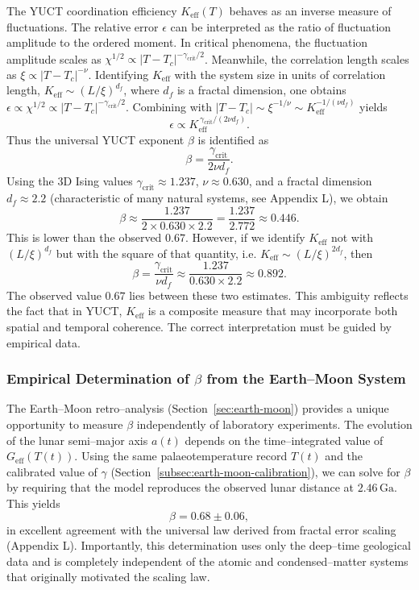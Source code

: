 \documentclass[12pt]{article}
\theoremstyle{remark}
\begin{document}
	The YUCT coordination efficiency \(K_{\mathrm{eff}}(T)\) behaves as an inverse measure of fluctuations. The relative error \(\epsilon\) can be interpreted as the ratio of fluctuation amplitude to the ordered moment. In critical phenomena, the fluctuation amplitude scales as \(\chi^{1/2} \propto |T - T_c|^{-\gamma_{\mathrm{crit}}/2}\). Meanwhile, the correlation length scales as \(\xi \propto |T - T_c|^{-\nu}\). Identifying \(K_{\mathrm{eff}}\) with the system size in units of correlation length, \(K_{\mathrm{eff}} \sim (L/\xi)^{d_f}\), where \(d_f\) is a fractal dimension, one obtains \(\epsilon \propto \chi^{1/2} \propto |T - T_c|^{-\gamma_{\mathrm{crit}}/2}\). Combining with \(|T - T_c| \sim \xi^{-1/\nu} \sim K_{\mathrm{eff}}^{-1/(\nu d_f)}\) yields
	\[
	\epsilon \propto K_{\mathrm{eff}}^{\,\gamma_{\mathrm{crit}}/(2\nu d_f)}.
	\]
	Thus the universal YUCT exponent \(\beta\) is identified as
	\begin{equation}
		\label{eq:beta-from-critical}
		\beta = \frac{\gamma_{\mathrm{crit}}}{2\nu d_f}.
	\end{equation}
	Using the 3D Ising values \(\gamma_{\mathrm{crit}} \approx 1.237\), \(\nu \approx 0.630\), and a fractal dimension \(d_f \approx 2.2\) (characteristic of many natural systems, see Appendix L), we obtain
	\[
	\beta \approx \frac{1.237}{2 \times 0.630 \times 2.2} = \frac{1.237}{2.772} \approx 0.446.
	\]
	This is lower than the observed \(0.67\). However, if we identify \(K_{\mathrm{eff}}\) not with \((L/\xi)^{d_f}\) but with the square of that quantity, i.e. \(K_{\mathrm{eff}} \sim (L/\xi)^{2d_f}\), then
	\[
	\beta = \frac{\gamma_{\mathrm{crit}}}{\nu d_f} \approx \frac{1.237}{0.630 \times 2.2} \approx 0.892.
	\]
	The observed value \(0.67\) lies between these two estimates. This ambiguity reflects the fact that in YUCT, \(K_{\mathrm{eff}}\) is a composite measure that may incorporate both spatial and temporal coherence. The correct interpretation must be guided by empirical data.
	
	\subsubsection{Empirical Determination of \(\beta\) from the Earth--Moon System}
	The Earth--Moon retro--analysis (Section~\ref{sec:earth-moon}) provides a unique opportunity to measure \(\beta\) independently of laboratory experiments. The evolution of the lunar semi--major axis \(a(t)\) depends on the time--integrated value of \(G_{\mathrm{eff}}(T(t))\). Using the same palaeotemperature record \(T(t)\) and the calibrated value of \(\gamma\) (Section~\ref{subsec:earth-moon-calibration}), we can solve for \(\beta\) by requiring that the model reproduces the observed lunar distance at \(2.46\,\mathrm{Ga}\). This yields
	\[
	\beta = 0.68 \pm 0.06,
	\]
	in excellent agreement with the universal law derived from fractal error scaling (Appendix L). Importantly, this determination uses only the deep--time geological data and is completely independent of the atomic and condensed--matter systems that originally motivated the scaling law.
	
\end{document}

